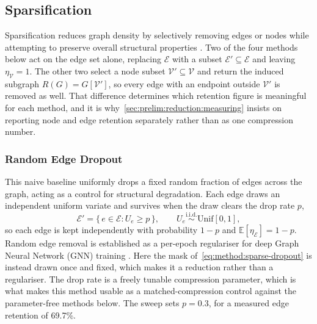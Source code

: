 \subsection{Sparsification}
\label{sec:method:reduction:sparsification}
Sparsification reduces graph density by selectively removing edges or nodes while attempting
to preserve overall structural properties \citep{hashemi2024survey}. Two of the four methods
below act on the edge set alone, replacing $\mathcal{E}$ with a subset
$\mathcal{E}' \subseteq \mathcal{E}$ and leaving $\eta_{\mathcal{V}} = 1$. The other two
select a node subset $\mathcal{V}' \subseteq \mathcal{V}$ and return the induced subgraph
$R(G) = G[\mathcal{V}']$, so every edge with an endpoint outside $\mathcal{V}'$ is removed as
well. That difference determines which retention figure is meaningful for each method, and it
is why~\ref{sec:prelim:reduction:measuring} insists on reporting node and edge retention
separately rather than as one compression number.

\subsubsection{Random Edge Dropout}
\label{sec:method:sparse:dropout}
This naive baseline uniformly drops a fixed random fraction of edges across the graph,
acting as a control for structural degradation. Each edge draws an independent uniform
variate and survives when the draw clears the drop rate $p$,
\begin{equation}
    \mathcal{E}' = \{\, e \in \mathcal{E} : U_e \geq p \,\},
    \qquad
    U_e \overset{\text{i.i.d.}}{\sim} \mathrm{Unif}[0,1],
    \label{eq:method:sparse-dropout}
\end{equation}
so each edge is kept independently with probability $1 - p$ and
$\mathbb{E}[\eta_{\mathcal{E}}] = 1 - p$. Random edge removal is established as a per-epoch
regulariser for deep Graph Neural Network (GNN) training \citep{rong2020dropedge}. Here the
mask of~\eqref{eq:method:sparse-dropout} is instead drawn once and fixed, which makes it a
reduction rather than a regulariser. The drop rate is a freely tunable compression parameter,
which is what makes this method usable as a matched-compression control against the
parameter-free methods below. The sweep sets $p = 0.3$, for a measured edge retention of
69.7\%.

